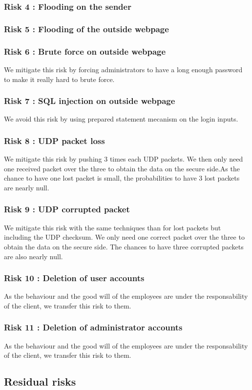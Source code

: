 \documentclass[a4paper,11pt]{article}
\begin{document}
\subsubsection{Risk 4 : Flooding on the sender}

\subsubsection{Risk 5 : Flooding of the outside webpage}

\subsubsection{Risk 6 : Brute force on outside webpage}
We mitigate this risk by forcing administrators to have a long enough password to make it really hard to brute force.
\subsubsection{Risk 7 : SQL injection on outside webpage}
We avoid this risk by using prepared statement mecanism on the login inputs.
\subsubsection{Risk 8 : UDP packet loss}
We mitigate this risk by pushing 3 times each UDP packets. We then only need one received packet over the three to obtain the data on the secure side.As the chance to have one lost packet is small, the probabilities to have 3 lost packets are nearly null.
\subsubsection{Risk 9 : UDP corrupted packet}
We mitigate this risk with the same techniques than for lost packets but including the UDP checksum. We only need one correct packet over the three to obtain the data on the secure side. The chances to have three corrupted packets are also nearly null.
\subsubsection{Risk 10 : Deletion of user accounts}
As the behaviour and the good will of the employees are under the responsability of the client, we transfer this risk to them.
\subsubsection{Risk 11 : Deletion of administrator accounts}
As the behaviour and the good will of the employees are under the responsability of the client, we transfer this risk to them.
\subsection{Residual risks}
\end{document}
